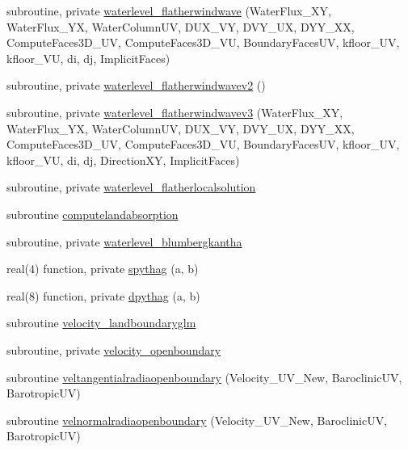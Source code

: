 \begin{DoxyCompactItemize}
\item 
subroutine, private \mbox{\hyperlink{namespacemodulehydrodynamic_a31821bc82ef6a38083be92796ac733a3}{waterlevel\+\_\+flatherwindwave}} (Water\+Flux\+\_\+\+XY, Water\+Flux\+\_\+\+YX, Water\+Column\+UV, D\+U\+X\+\_\+\+VY, D\+V\+Y\+\_\+\+UX, D\+Y\+Y\+\_\+\+XX, Compute\+Faces3\+D\+\_\+\+UV, Compute\+Faces3\+D\+\_\+\+VU, Boundary\+Faces\+UV, kfloor\+\_\+\+UV, kfloor\+\_\+\+VU, di, dj, Implicit\+Faces)
\item 
subroutine, private \mbox{\hyperlink{namespacemodulehydrodynamic_ad3ece2178c3e256dbf915ccbe0b88599}{waterlevel\+\_\+flatherwindwavev2}} ()
\item 
subroutine, private \mbox{\hyperlink{namespacemodulehydrodynamic_ae8536b67d3763d371e3025b09e7920a6}{waterlevel\+\_\+flatherwindwavev3}} (Water\+Flux\+\_\+\+XY, Water\+Flux\+\_\+\+YX, Water\+Column\+UV, D\+U\+X\+\_\+\+VY, D\+V\+Y\+\_\+\+UX, D\+Y\+Y\+\_\+\+XX, Compute\+Faces3\+D\+\_\+\+UV, Compute\+Faces3\+D\+\_\+\+VU, Boundary\+Faces\+UV, kfloor\+\_\+\+UV, kfloor\+\_\+\+VU, di, dj, Direction\+XY, Implicit\+Faces)
\item 
subroutine, private \mbox{\hyperlink{namespacemodulehydrodynamic_a9e27696e9df4a46aae637e4ecb5bb626}{waterlevel\+\_\+flatherlocalsolution}}
\item 
subroutine \mbox{\hyperlink{namespacemodulehydrodynamic_a2cc7d18aae53734d8068f7a35a0fd029}{computelandabsorption}}
\item 
subroutine, private \mbox{\hyperlink{namespacemodulehydrodynamic_ae5c38adbe04a8331efddb3eb147a9de3}{waterlevel\+\_\+blumbergkantha}}
\item 
real(4) function, private \mbox{\hyperlink{namespacemodulehydrodynamic_ad663f2d92092122d354c40c8e3be00b0}{spythag}} (a, b)
\item 
real(8) function, private \mbox{\hyperlink{namespacemodulehydrodynamic_a0f02ba5b0cd9a0eb64c1d50570398e36}{dpythag}} (a, b)
\item 
subroutine \mbox{\hyperlink{namespacemodulehydrodynamic_a678adb3cd056a0f44a4c7ba6b7ba8544}{velocity\+\_\+landboundaryglm}}
\item 
subroutine, private \mbox{\hyperlink{namespacemodulehydrodynamic_ad3f40e56e615a729156e48c10775bde3}{velocity\+\_\+openboundary}}
\item 
subroutine \mbox{\hyperlink{namespacemodulehydrodynamic_a52c5b67b475eb26914ed1a1975345d69}{veltangentialradiaopenboundary}} (Velocity\+\_\+\+U\+V\+\_\+\+New, Baroclinic\+UV, Barotropic\+UV)
\item 
subroutine \mbox{\hyperlink{namespacemodulehydrodynamic_a2ee641749eb16598ae6dfe7afd0e53ef}{velnormalradiaopenboundary}} (Velocity\+\_\+\+U\+V\+\_\+\+New, Baroclinic\+UV, Barotropic\+UV)

\end{DoxyCompactItemize}
